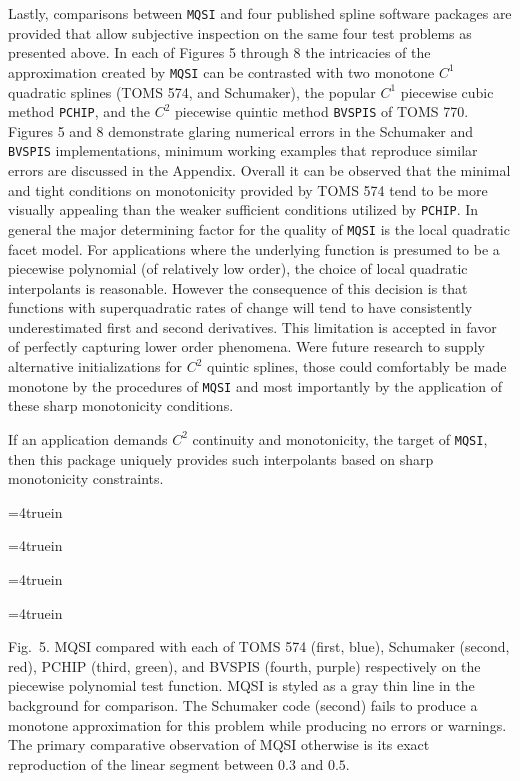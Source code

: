 Lastly, comparisons between {\tt MQSI} and four published spline
software packages are provided that allow subjective inspection on the
same four test problems as presented above. In each of Figures 5
through 8 the intricacies of the approximation created by {\tt MQSI}
can be contrasted with two monotone $C^1$ quadratic splines (TOMS 574,
and Schumaker), the popular $C^1$ piecewise cubic method {\tt PCHIP},
and the $C^2$ piecewise quintic method {\tt BVSPIS} of TOMS
770. Figures 5 and 8 demonstrate glaring numerical errors in the
Schumaker and {\tt BVSPIS} implementations, \textRed minimum working
examples that reproduce similar errors are discussed in the Appendix.
\textBlack Overall it can be observed that the minimal and tight
conditions on monotonicity provided by TOMS 574 tend to be more
visually appealing than the weaker sufficient conditions utilized by
{\tt PCHIP}. In general the major determining factor for the quality
of {\tt MQSI} is the local quadratic facet model. For applications
where the underlying function is presumed to be a piecewise polynomial
(of relatively low order), the choice of local quadratic interpolants
is reasonable. However the consequence of this decision is that
functions with superquadratic rates of change will tend to have
consistently underestimated first and second derivatives. This
limitation is accepted in favor of perfectly capturing lower order
phenomena. Were future research to supply alternative initializations
for $C^2$ quintic splines, those could comfortably be made monotone by
the procedures of {\tt MQSI} and most importantly by the application
of these sharp monotonicity conditions.

If an application demands $C^2$ continuity and monotonicity, the
target of {\tt MQSI}, then this package uniquely provides such
interpolants based on sharp monotonicity constraints.

\goodbreak

\topinsert
\centerline{\epsfxsize=4truein }
\centerline{\epsfxsize=4truein }
\centerline{\epsfxsize=4truein }
\centerline{\epsfxsize=4truein }
{\narrower\noindent\rmVIII Fig.\ 5.
{\ttVIII MQSI} compared with each of TOMS 574 (first, blue), Schumaker
(second, red), {\ttVIII PCHIP} (third, green), and {\ttVIII BVSPIS}
(fourth, purple) respectively on the {\itVIII piecewise polynomial}
test function. {\ttVIII MQSI} is styled as a gray thin line in the
background for comparison. The Schumaker code (second) fails to
produce a monotone approximation for this problem while producing no
errors or warnings. The primary comparative observation of {\ttVIII
  MQSI} otherwise is its exact reproduction of the linear segment
between $0.3$ and $0.5$.
\par}
\endinsert

